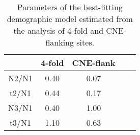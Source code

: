 \begin{table}[h!]
\centering
\caption[Parameters of the best-fitting demographic model estimated from the analysis of 4-fold and CNE-flanking sites]{Parameters of the best-fitting demographic model estimated from the analysis of 4-fold and CNE-flanking sites. }
 \begin{tabular}{c c c c c } 

\toprule
	&4-fold	&CNE-flank \\ \hline
N2/N1&	0.40&	0.07 \\
t2/N1&	0.44&	0.17 \\
N3/N1&	0.40&	1.00 \\
t3/N1&	1.10&	0.63 \\
\bottomrule

\end{tabular}
\label{tab:C3S2}
\end{table}